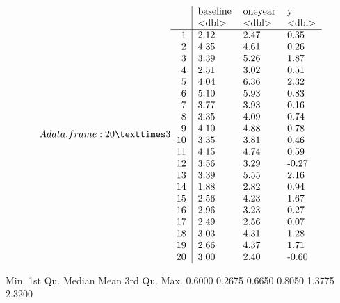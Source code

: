 \documentclass[letterpaper,10pt,english]{jupyterBook}
\begin{document}
\begin{sphinxVerbatim}[commandchars=\\\{\}]
    
   
\end{sphinxVerbatim}
\begin{equation*}
\begin{split}A data.frame: 20 × 3
\begin{tabular}{r|lll}
  & baseline & oneyear & y\\
  & <dbl> & <dbl> & <dbl>\\
\hline
	1 & 2.12 & 2.47 &  0.35\\
	2 & 4.35 & 4.61 &  0.26\\
	3 & 3.39 & 5.26 &  1.87\\
	4 & 2.51 & 3.02 &  0.51\\
	5 & 4.04 & 6.36 &  2.32\\
	6 & 5.10 & 5.93 &  0.83\\
	7 & 3.77 & 3.93 &  0.16\\
	8 & 3.35 & 4.09 &  0.74\\
	9 & 4.10 & 4.88 &  0.78\\
	10 & 3.35 & 3.81 &  0.46\\
	11 & 4.15 & 4.74 &  0.59\\
	12 & 3.56 & 3.29 & -0.27\\
	13 & 3.39 & 5.55 &  2.16\\
	14 & 1.88 & 2.82 &  0.94\\
	15 & 2.56 & 4.23 &  1.67\\
	16 & 2.96 & 3.23 &  0.27\\
	17 & 2.49 & 2.56 &  0.07\\
	18 & 3.03 & 4.31 &  1.28\\
	19 & 2.66 & 4.37 &  1.71\\
	20 & 3.00 & 2.40 & -0.60\\
\end{tabular}\end{split}
\end{equation*}
\begin{sphinxVerbatim}[commandchars=\\\{\}]
   Min. 1st Qu.  Median    Mean 3rd Qu.    Max. 
\PYGZhy{}0.6000  0.2675  0.6650  0.8050  1.3775  2.3200 
\end{sphinxVerbatim}
\end{document}
